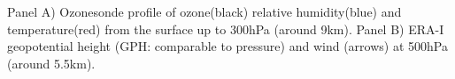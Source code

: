 \label{fig:MelbStormSonde}
Panel A) Ozonesonde profile of ozone(black) relative humidity(blue) and temperature(red) from the surface up to 300hPa (around 9km).
Panel B) ERA-I geopotential height (GPH: comparable to pressure) and wind (arrows) at 500hPa (around 5.5km).